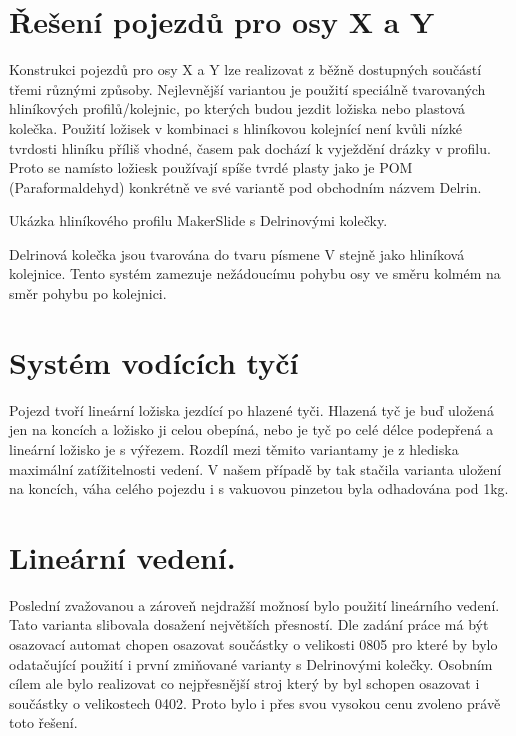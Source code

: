 \section{Řešení pojezdů pro osy X a Y}

Konstrukci pojezdů pro osy X a Y lze realizovat z běžně dostupných součástí třemi různými způsoby. Nejlevnější variantou je použití speciálně tvarovaných hliníkových profilů/kolejnic, po kterých budou jezdit ložiska nebo plastová kolečka. Použití ložisek v kombinaci s hliníkovou kolejnící není kvůli nízké tvrdosti hliníku příliš vhodné, časem pak dochází k vyježdění drázky v profilu. Proto se namísto ložiesk používají spíše tvrdé plasty jako je POM (Paraformaldehyd) konkrétně ve své variantě pod obchodním názvem Delrin. 

Ukázka hliníkového profilu MakerSlide s Delrinovými kolečky.

Delrinová kolečka jsou tvarována do tvaru písmene V stejně jako hliníková kolejnice. Tento systém zamezuje nežádoucímu pohybu osy ve směru kolmém na směr pohybu po kolejnici.

\section{Systém vodících tyčí}

Pojezd tvoří lineární ložiska jezdící po hlazené tyči. Hlazená tyč je buď uložená jen na koncích a ložisko ji celou obepíná, nebo je tyč po celé délce podepřená a lineární ložisko je s výřezem. Rozdíl mezi těmito variantamy je z hlediska maximální zatížitelnosti vedení. V našem případě by tak stačila varianta uložení  na koncích, váha celého pojezdu i s vakuovou pinzetou byla odhadována pod 1kg.

\section{Lineární vedení.}
Poslední zvažovanou a zároveň nejdražší možnosí bylo použití lineárního vedení. Tato varianta slibovala dosažení největších přesností. Dle zadání práce má být osazovací automat chopen osazovat součástky o velikosti 0805 pro které by bylo odatačující použití i první zmiňované varianty s Delrinovými kolečky. Osobním cílem ale bylo realizovat co nejpřesnější stroj který by byl schopen  osazovat i součástky o velikostech 0402. Proto bylo i přes svou vysokou cenu zvoleno právě toto řešení.

